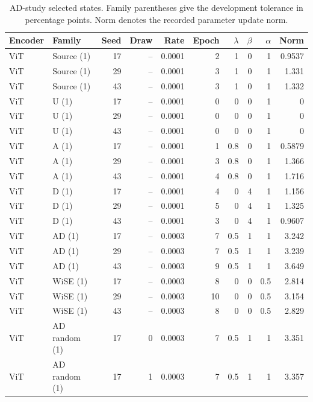 \begin{table}[t]
\centering
\scriptsize
\setlength{\tabcolsep}{3pt}
\begin{tabular}{llrrrrrrrr}
\toprule
Encoder & Family & Seed & Draw & Rate & Epoch & $\lambda$ & $\beta$ & $\alpha$ & Norm\\
\midrule
ViT & Source (1) & 17 & -- & 0.0001 & 2 & 1 & 0 & 1 & 0.9537\\
ViT & Source (1) & 29 & -- & 0.0001 & 3 & 1 & 0 & 1 & 1.331\\
ViT & Source (1) & 43 & -- & 0.0001 & 3 & 1 & 0 & 1 & 1.332\\
ViT & U (1) & 17 & -- & 0.0001 & 0 & 0 & 0 & 1 & 0\\
ViT & U (1) & 29 & -- & 0.0001 & 0 & 0 & 0 & 1 & 0\\
ViT & U (1) & 43 & -- & 0.0001 & 0 & 0 & 0 & 1 & 0\\
ViT & A (1) & 17 & -- & 0.0001 & 1 & 0.8 & 0 & 1 & 0.5879\\
ViT & A (1) & 29 & -- & 0.0001 & 3 & 0.8 & 0 & 1 & 1.366\\
ViT & A (1) & 43 & -- & 0.0001 & 4 & 0.8 & 0 & 1 & 1.716\\
ViT & D (1) & 17 & -- & 0.0001 & 4 & 0 & 4 & 1 & 1.156\\
ViT & D (1) & 29 & -- & 0.0001 & 5 & 0 & 4 & 1 & 1.325\\
ViT & D (1) & 43 & -- & 0.0001 & 3 & 0 & 4 & 1 & 0.9607\\
ViT & AD (1) & 17 & -- & 0.0003 & 7 & 0.5 & 1 & 1 & 3.242\\
ViT & AD (1) & 29 & -- & 0.0003 & 7 & 0.5 & 1 & 1 & 3.239\\
ViT & AD (1) & 43 & -- & 0.0003 & 9 & 0.5 & 1 & 1 & 3.649\\
ViT & WiSE (1) & 17 & -- & 0.0003 & 8 & 0 & 0 & 0.5 & 2.814\\
ViT & WiSE (1) & 29 & -- & 0.0003 & 10 & 0 & 0 & 0.5 & 3.154\\
ViT & WiSE (1) & 43 & -- & 0.0003 & 8 & 0 & 0 & 0.5 & 2.829\\
ViT & AD random (1) & 17 & 0 & 0.0003 & 7 & 0.5 & 1 & 1 & 3.351\\
ViT & AD random (1) & 17 & 1 & 0.0003 & 7 & 0.5 & 1 & 1 & 3.357\\
\bottomrule
\end{tabular}
\caption{AD-study selected states. Family parentheses give the development tolerance in percentage points. Norm denotes the recorded parameter update norm.}\label{tab:adselected0}
\end{table}


